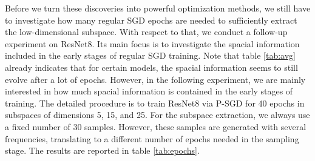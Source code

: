 \documentclass[11pt, a4paper]{article}
\begin{document}
Before we turn these discoveries into powerful optimization methods, we still have to investigate how many regular SGD epochs are needed to sufficiently extract the low-dimensional subspace. With respect to that, we conduct a follow-up experiment on ResNet8. Its main focus is to investigate the spacial information included in the early stages of regular SGD training. Note that table \ref{tab:avg} already indicates that for certain models, the spacial information seems to still evolve after a lot of epochs. However, in the following experiment, we are mainly interested in how much spacial information is contained in the early stages of training. The detailed procedure is to train ResNet8 via P-SGD for 40 epochs in subspaces of dimensions 5, 15, and 25. For the subspace extraction, we always use a fixed number of 30 samples. However, these samples are generated with several frequencies, translating to a different number of epochs needed in the sampling stage. The results are reported in table \ref{tab:epochs}.

\end{document}
